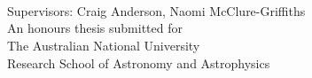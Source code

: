 
\begin{titlepage}
  \begin{center}
    \makeatletter
    {\Huge\textbf{\@title}} \\[.4cm]
    {\Huge\textbf{\thesisqualifier}} \\[.4cm]
    {\huge\textbf{\@author}} \\ [.4cm]
    {\large Supervisors: Craig Anderson, Naomi McClure-Griffiths} \\[7cm]
    \makeatother
    {\large An honours thesis submitted for \\
    The Australian National University \\
    Research School of Astronomy and Astrophysics}\\[2cm]
    {\LARGE \thismonth}
  \end{center}
\end{titlepage}
